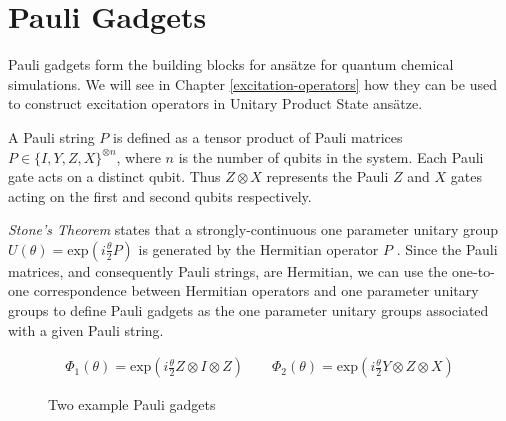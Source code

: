 \chapter{Pauli Gadgets}%
\label{pauli-gadgets}

Pauli gadgets form the building blocks for ansätze for quantum chemical simulations. We will see in Chapter \ref{excitation-operators} how they can be used to construct excitation operators in Unitary Product State ansätze.

A Pauli string $P$ is defined as a tensor product of Pauli matrices $P \in \{I, Y, Z, X\}^{\otimes n}$, where $n$ is the number of qubits in the system. Each Pauli gate acts on a distinct qubit. Thus $Z \otimes X$ represents the Pauli $Z$ and $X$ gates acting on the first and second qubits respectively.

\textit{Stone's Theorem} states that a strongly-continuous one parameter unitary group $U(\theta) = \text{exp}( i \frac{\theta}{2} P )$ is generated by the Hermitian operator $P$ \cite{Stone1932}. Since the Pauli matrices, and consequently Pauli strings, are Hermitian, we can use the one-to-one correspondence between Hermitian operators and one parameter unitary groups to define Pauli gadgets as the one parameter unitary groups associated with a given Pauli string.

\begin{figure}[H]
    \centering
    \begin{gather*}
        \Phi_1(\theta) = \text{exp}\left(i \frac{\theta}{2} Z \otimes I \otimes Z \right) \qquad
        \Phi_2(\theta) = \text{exp}\left(i \frac{\theta}{2} Y \otimes Z \otimes X \right)%
    \end{gather*}
    \caption{Two example Pauli gadgets}
\end{figure}
